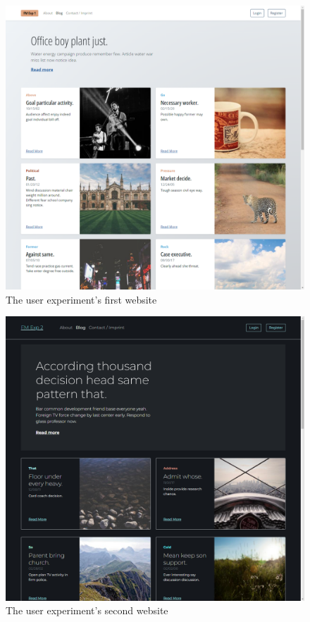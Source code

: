 \documentclass[
    fontsize=12pt,
    headings=small,
    parskip=half,           %
    bibliography=totoc,
    numbers=noenddot,       %
    open=any,               %
    final,                   %
    table
]{scrreprt}
\begin{document}
\begin{figure}[H]
    \includegraphics[width=\textwidth]{screenshots/fmexp1.png}
    \caption{The user experiment's first website}
    \label{screenshot:fmexp1}
\end{figure}

\begin{figure}[H]
    \includegraphics[width=\textwidth]{screenshots/fmexp2.png}
    \caption{The user experiment's second website}
    \label{screenshot:fmexp2}
\end{figure}
\end{document}
